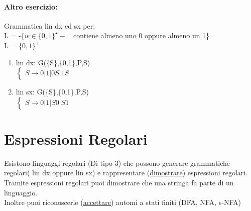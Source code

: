 \documentclass[12pt, a4paper, openany, oneside]{book}
\begin{document}
\paragraph{Altro esercizio: } Grammatica lin dx ed sx per:\\
L = -$\{w\in \{0,1\}^{\star}-$ | contiene almeno uno 0 oppure almeno un 1\}\\
L = $\{0,1\}^{+}$
\begin{enumerate}
	\item lin dx: G(\{S\},\{0,1\},P,S)\\
	$\begin{cases}
	S \to 0|1|0S|1S
	\end{cases}$
	\item lin sx: G(\{S\},\{0,1\},P,S)\\
	$\begin{cases}
	S \to 0|1|S0|S1
	\end{cases}$
\end{enumerate}
\section{Espressioni Regolari}
Esistono linguaggi regolari (Di tipo 3) che possono generare grammatiche regolari(
lin dx oppure lin sx) e rappresentare (\underline{dimostrare}) espressioni 
regolari.\\
Tramite espressioni regolari puoi dimostrare che una stringa fa parte di un 
linguaggio.\\
Inoltre puoi riconoscerle (\underline{accettare}) automi a stati finiti (DFA, 
NFA, $\epsilon$-NFA)
\end{document}
